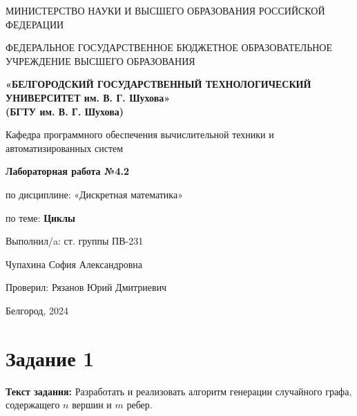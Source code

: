 \documentclass[12pt]{article}
\begin{document}
	\begin{center}
		{\parskip=1cm
			МИНИСТЕРСТВО НАУКИ И ВЫСШЕГО ОБРАЗОВАНИЯ РОССИЙСКОЙ ФЕДЕРАЦИИ
			
			ФЕДЕРАЛЬНОЕ ГОСУДАРСТВЕННОЕ БЮДЖЕТНОЕ ОБРАЗОВАТЕЛЬНОЕ УЧРЕЖДЕНИЕ ВЫСШЕГО ОБРАЗОВАНИЯ
			
			{\bf«БЕЛГОРОДСКИЙ ГОСУДАРСТВЕННЫЙ ТЕХНОЛОГИЧЕСКИЙ УНИВЕРСИТЕТ им. В. Г. Шухова»\\(БГТУ им. В. Г. Шухова)}
			
			\begin{figure}[bh]
				\noindent{}
			\end{figure}
			Кафедра программного обеспечения вычислительной техники и автоматизированных систем
		}
		
		{\Large 
			\vspace{1cm}
			{\parskip=0.25cm 
				{\bf Лабораторная работа №4.2}
				
				по дисциплине: «Дискретная математика»
				
				по теме: {\bf Циклы}
			}
		}
	\end{center}	
	\begin{flushleft}
		{\leftskip=10cm
			{\vspace{3cm} Выполнил/a: ст. группы ПВ-231}
			
			Чупахина София Александровна
			
			Проверил: Рязанов Юрий Дмитриевич
			
		}
	\end{flushleft}
	\begin{center}
		{\parskip=3cm Белгород, 2024}
	\end{center}
	\newpage

	\tableofcontents
	
	\newpage
	
	\section{Задание 1}
	\label{task1}
	{\bf Текст задания:} Разработать и реализовать алгоритм генерации случайного графа, содержащего $n$ вершин и $m$ ребер. 
	
\end{document}
